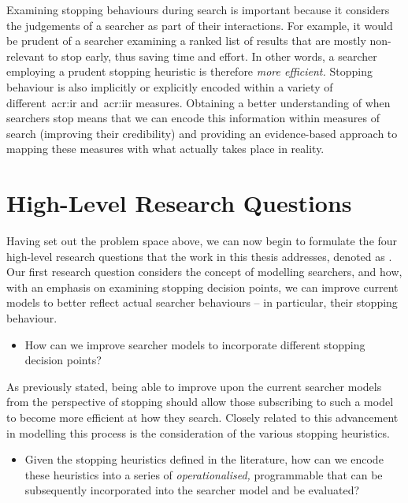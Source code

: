 Examining stopping behaviours during search is important because it considers the judgements of a searcher as part of their interactions. For example, it would be prudent of a searcher examining a ranked list of results that are mostly non-relevant to stop early, thus saving time and effort. In other words, a searcher employing a prudent stopping heuristic is therefore \emph{more efficient.} Stopping behaviour is also implicitly or explicitly encoded within a variety of different~\gls{acr:ir} and~\gls{acr:iir} measures. Obtaining a better understanding of when searchers stop means that we can encode this information within measures of search (improving their credibility) and providing an evidence-based approach to mapping these measures with what actually takes place in reality.

\section{High-Level Research Questions}\label{sec:intro:rqs}
Having set out the problem space above, we can now begin to formulate the four high-level research questions that the work in this thesis addresses, denoted as . Our first research question considers the concept of modelling searchers, and how, with an emphasis on examining stopping decision points, we can improve current models to better reflect actual searcher behaviours -- in particular, their stopping behaviour.

\begin{itemize}
    \item[]{ How can we improve searcher models to incorporate different stopping decision points?}
\end{itemize}

As previously stated, being able to improve upon the current searcher models from the perspective of stopping should allow those subscribing to such a model to become more efficient at how they search. Closely related to this advancement in modelling this process is the consideration of the various stopping heuristics.

\begin{itemize}
    \item[]{ Given the stopping heuristics defined in the literature, how can we encode these heuristics into a series of \emph{operationalised,} programmable  that can be subsequently incorporated into the searcher model and be evaluated?}
\end{itemize}

